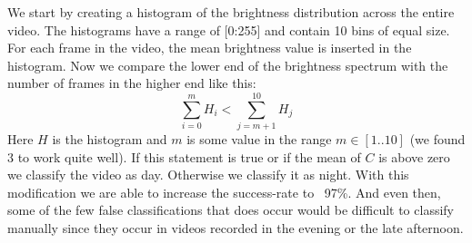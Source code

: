 We start by creating a histogram of the brightness distribution across the entire video. The histograms have a range of [0:255] and contain 10 bins of equal size. For each frame in the video, the mean brightness value is inserted in the histogram. Now we compare the lower
%
%
end of the brightness spectrum
%
%
with the number of frames in the higher end like this:
%
\begin{equation}
\sum_{i=0}^{m}H_{i} < \sum_{j=m+1}^{10}H_{j}
\end{equation}
%
%
%
Here $H$ is the histogram and $m$ is some value in the range $m\in [1..10]$ (we found $3$ to work quite well). If this statement is true or if the mean of $C$ is above zero we classify the video as day. Otherwise we classify it as night. With this modification we are able to increase the success-rate to ~97\%. And even then, some of the few false classifications that does occur would be difficult to classify manually since they occur in videos recorded in the evening or the late afternoon.
